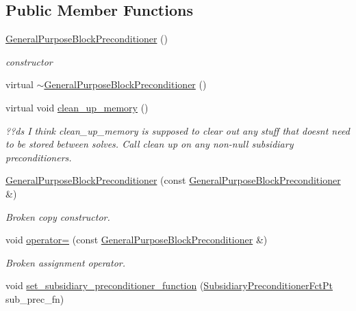 \subsection*{Public Member Functions}
\begin{DoxyCompactItemize}
\item 
\hyperlink{classoomph_1_1GeneralPurposeBlockPreconditioner_a4269f62ded274bb1b58a46e3773dc739}{General\+Purpose\+Block\+Preconditioner} ()
\begin{DoxyCompactList}\small\item\em constructor \end{DoxyCompactList}\item 
virtual \hyperlink{classoomph_1_1GeneralPurposeBlockPreconditioner_a434ab0c34c615bf29f82cf81e2639258}{$\sim$\+General\+Purpose\+Block\+Preconditioner} ()
\item 
virtual void \hyperlink{classoomph_1_1GeneralPurposeBlockPreconditioner_a3272742d3c7f86327d33c5647af874e6}{clean\+\_\+up\+\_\+memory} ()
\begin{DoxyCompactList}\small\item\em ??ds I think clean\+\_\+up\+\_\+memory is supposed to clear out any stuff that doesn\textquotesingle{}t need to be stored between solves. Call clean up on any non-\/null subsidiary preconditioners. \end{DoxyCompactList}\item 
\hyperlink{classoomph_1_1GeneralPurposeBlockPreconditioner_ab51a9cf7efc0f0f60c122e0ab845a9ea}{General\+Purpose\+Block\+Preconditioner} (const \hyperlink{classoomph_1_1GeneralPurposeBlockPreconditioner}{General\+Purpose\+Block\+Preconditioner} \&)
\begin{DoxyCompactList}\small\item\em Broken copy constructor. \end{DoxyCompactList}\item 
void \hyperlink{classoomph_1_1GeneralPurposeBlockPreconditioner_a5f10bb824b96677f6b481c96831f0a61}{operator=} (const \hyperlink{classoomph_1_1GeneralPurposeBlockPreconditioner}{General\+Purpose\+Block\+Preconditioner} \&)
\begin{DoxyCompactList}\small\item\em Broken assignment operator. \end{DoxyCompactList}\item 
void \hyperlink{classoomph_1_1GeneralPurposeBlockPreconditioner_af28361c79296ae7410b950b74754496c}{set\+\_\+subsidiary\+\_\+preconditioner\+\_\+function} (\hyperlink{classoomph_1_1GeneralPurposeBlockPreconditioner_a4818c6bde7206cd9b5df4f8c1e3a3c34}{Subsidiary\+Preconditioner\+Fct\+Pt} sub\+\_\+prec\+\_\+fn)

\end{DoxyCompactItemize}
